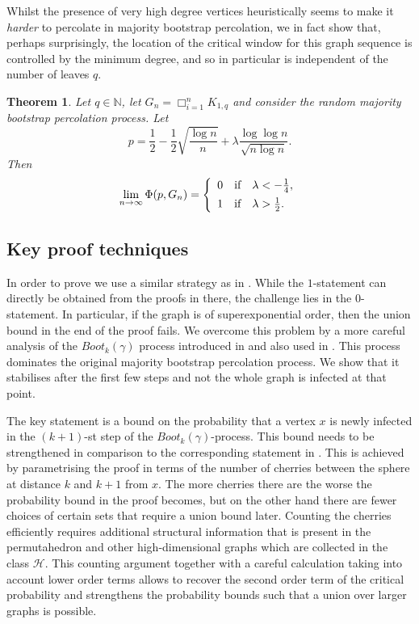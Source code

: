 \documentclass[reqno,a4paper,11pt]{amsart}
\newtheorem{theorem}{Theorem}[section]
\theoremstyle{definition}
\newcommand{\car}{\mathbin{\Box}}
\begin{document}
Whilst the presence of very high degree vertices heuristically seems to make it \emph{harder} to percolate in majority bootstrap percolation, we in fact show that, perhaps surprisingly, the location of the critical window for this graph sequence is controlled by the minimum degree, and so in particular is independent of the number of leaves $q$.

\begin{theorem}\label{t:star}
  Let $q\in \mathbb N$, let $G_n = \car_{i=1}^n K_{1, q}$ and consider the random majority bootstrap percolation process.
  Let
  \[
    p = \frac{1}{2}-\frac{1}{2} \sqrt{\frac{\log n}{n}}+ \lambda \frac{\log \log n}{\sqrt{n \log n}}.
  \]
  Then
  \[
    \lim_{n \to \infty} \Phi(p, G_n) = \left\{
      \begin{array} {c@{\quad \textup{if} \quad}l}
        0 & \lambda < -\frac{1}{4}, \\[+1ex]
        1 & \lambda > \frac{1}{2}.
      \end{array}\right.
  \]
\end{theorem}

\subsection{Key proof techniques}

In order to prove  we use a similar strategy as in \cite{BaBoMo2009,CEGK24}.
While the $1$-statement can directly be obtained from the proofs in there, the challenge lies in the $0$-statement.
In particular, if the graph is of superexponential order, then the union bound in the end of the proof fails.
We overcome this problem by a more careful analysis of the $Boot_k(\gamma)$ process introduced in \cite{BaBoMo2009} and also used in \cite{ CEGK24}.
This process dominates the original majority bootstrap percolation process.
We show that it stabilises after the first few steps and not the whole graph is infected at that point.

The key statement is a bound on the probability that a vertex $x$ is newly infected in the $(k+1)$-st step of the $Boot_k(\gamma)$-process.
This bound needs to be strengthened in comparison to the corresponding statement in \cite[Lemma 5.1]{CEGK24}.
This is achieved by parametrising the proof in terms of the number of cherries between the sphere at distance $k$ and $k+1$ from $x$.
The more cherries there are the worse the probability bound in the proof becomes, but on the other hand there are fewer choices of certain sets that require a union bound later.
Counting the cherries efficiently requires additional structural information that is present in the permutahedron and other high-dimensional graphs which are collected in the class $\mathcal{H}$.
This counting argument together with a careful calculation taking into account lower order terms allows to recover the second order term of the critical probability and strengthens the probability bounds such that a union over larger graphs is possible.
\end{document}
